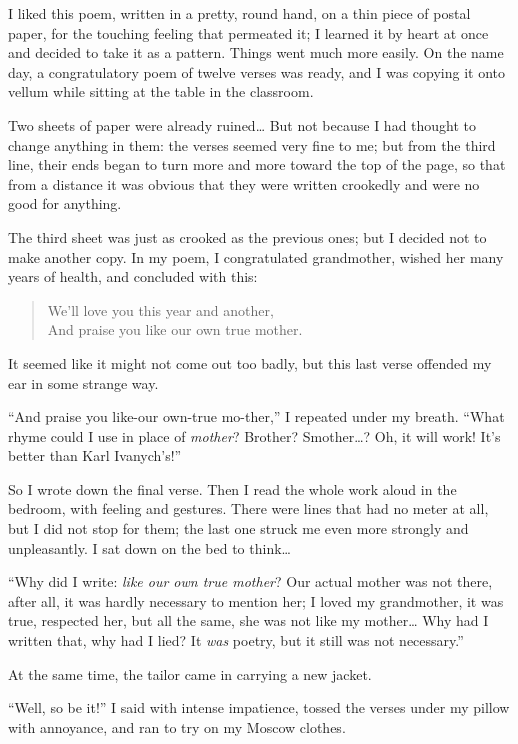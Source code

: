 I liked this poem, written in a pretty, round hand, on a thin piece of postal paper, for the touching feeling that permeated it; I learned it by heart at once and decided to take it as a pattern. Things went much more easily. On the name day, a congratulatory poem of twelve verses was ready, and I was copying it onto vellum while sitting at the table in the classroom.

Two sheets of paper were already ruined\ldots{} But not because I had thought to change anything in them: the verses seemed very fine to me; but from the third line, their ends began to turn more and more toward the top of the page, so that from a distance it was obvious that they were written crookedly and were no good for anything.

The third sheet was just as crooked as the previous ones; but I decided not to make another copy. In my poem, I congratulated grandmother, wished her many years of health, and concluded with this:

\begin{verse}
We'll love you this year and another,\\
And praise you like our own true mother.
\end{verse}

It seemed like it might not come out too badly, but this last verse offended my ear in some strange way.

``And praise you like-our own-true mo-ther,'' I repeated under my breath. ``What rhyme could I use in place of \emph{mother}? Brother? Smother\ldots{}? Oh, it will work! It's better than Karl Ivanych's!'' %

So I wrote down the final verse. Then I read the whole work aloud in the bedroom, with feeling and gestures. There were lines that had no meter at all, but I did not stop for them; the last one struck me even more strongly and unpleasantly. I sat down on the bed to think\ldots{}

``Why did I write: \textit{like our own true mother}? Our actual mother was not there, after all, it was hardly necessary to mention her; I loved my grandmother, it was true, respected her, but all the same, she was not like my mother\ldots{} Why had I written that, why had I lied? It \emph{was} poetry, but it still was not necessary.'' %

At the same time, the tailor came in carrying a new jacket.

``Well, so be it!'' I said with intense impatience, tossed the verses under my pillow with annoyance, and ran to try on my Moscow clothes. %

